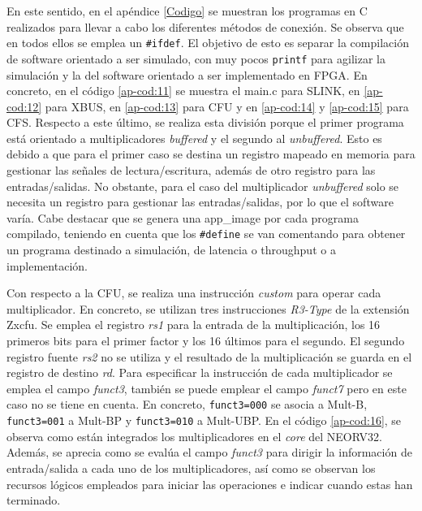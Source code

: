 En este sentido, en el apéndice \ref{Codigo} se muestran los programas en C realizados para llevar a cabo los diferentes métodos de conexión.
Se observa que en todos ellos se emplea un \texttt{#ifdef}.
El objetivo de esto es separar la compilación de software orientado a ser simulado, con muy pocos \texttt{printf} para agilizar la simulación y la del software orientado a ser implementado en FPGA.
En concreto, en el código \ref{ap-cod:11} se muestra el main.c para SLINK, en \ref{ap-cod:12} para XBUS, en \ref{ap-cod:13} para CFU y en \ref{ap-cod:14} y \ref{ap-cod:15} para CFS.
Respecto a este último, se realiza esta división porque el primer programa está orientado a multiplicadores \textit{buffered} y el segundo al \textit{unbuffered}.
Esto es debido a que para el primer caso se destina un registro mapeado en memoria para gestionar las señales de lectura/escritura, además de otro registro para las entradas/salidas. No obstante, para el caso del multiplicador \textit{unbuffered} solo se necesita un registro para gestionar las entradas/salidas, por lo que el software varía.
Cabe destacar que se genera una app\_image por cada programa compilado, teniendo en cuenta que los \texttt{#define} se van comentando para obtener un programa destinado a simulación, de latencia o throughput o a implementación.

Con respecto a la CFU, se realiza una instrucción \textit{custom} para operar cada multiplicador.
En concreto, se utilizan tres instrucciones \textit{R3-Type} de la extensión Zxcfu.
Se emplea el registro \textit{rs1} para la entrada de la multiplicación, los 16 primeros bits para el primer factor y los 16 últimos para el segundo.
El segundo registro fuente \textit{rs2} no se utiliza y el resultado de la multiplicación se guarda en el registro de destino \textit{rd}.
Para especificar la instrucción de cada multiplicador se emplea el campo \textit{funct3}, también se puede emplear el campo \textit{funct7} pero en este caso no se tiene en cuenta.
En concreto, \texttt{funct3=000} se asocia a Mult-B, \texttt{funct3=001} a Mult-BP y \texttt{funct3=010} a Mult-UBP.
En el código \ref{ap-cod:16}, se observa como están integrados los multiplicadores en el \textit{core} del NEORV32.
Además, se aprecia como se evalúa el campo \textit{funct3} para dirigir la información de entrada/salida a cada uno de los multiplicadores, así como se observan los recursos lógicos empleados para iniciar las operaciones e indicar cuando estas han terminado.

